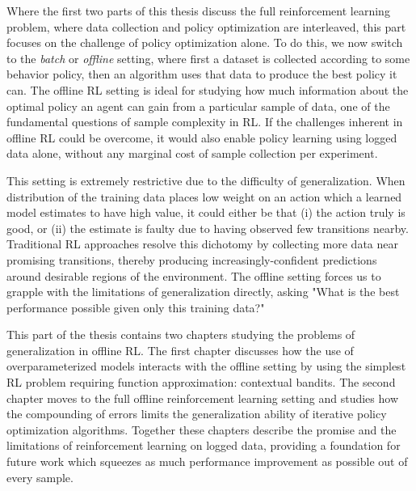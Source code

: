 Where the first two parts of this thesis discuss the full reinforcement learning problem, where data collection and policy optimization are interleaved, this part focuses on the challenge of policy optimization alone.
To do this, we now switch to the \emph{batch} or \emph{offline} setting, where first a dataset is collected according to some behavior policy, then an algorithm uses that data to produce the best policy it can.
The offline RL setting is ideal for studying how much information about the optimal policy an agent can gain from a particular sample of data, one of the fundamental questions of sample complexity in RL.
If the challenges inherent in offline RL could be overcome, it would also enable policy learning using logged data alone, without any marginal cost of sample collection per experiment.

This setting is extremely restrictive due to the difficulty of generalization.
When distribution of the training data places low weight on an action which a learned model estimates to have high value, it could either be that (i) the action truly is good, or (ii) the estimate is faulty due to having observed few transitions nearby.
Traditional RL approaches resolve this dichotomy by collecting more data near promising transitions, thereby producing increasingly-confident predictions around desirable regions of the environment.
The offline setting forces us to grapple with the limitations of generalization directly, asking "What is the best performance possible given only this training data?"

This part of the thesis contains two chapters studying the problems of generalization in offline RL.
The first chapter discusses how the use of overparameterized models interacts with the offline setting by using the simplest RL problem requiring function approximation: contextual bandits.
The second chapter moves to the full offline reinforcement learning setting and studies how the compounding of errors limits the generalization ability of iterative policy optimization algorithms.
Together these chapters describe the promise and the limitations of reinforcement learning on logged data, providing a foundation for future work which squeezes as much performance improvement as possible out of every sample.
